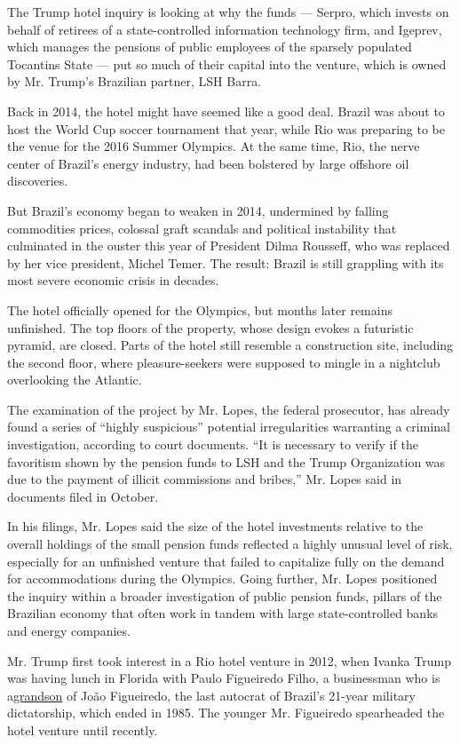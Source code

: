 The Trump hotel inquiry is looking at why the funds --- Serpro, which
invests on behalf of retirees of a state-controlled information
technology firm, and Igeprev, which manages the pensions of public
employees of the sparsely populated Tocantins State --- put so much of
their capital into the venture, which is owned by Mr. Trump's Brazilian
partner, LSH Barra.

Back in 2014, the hotel might have seemed like a good deal. Brazil was
about to host the World Cup soccer tournament that year, while Rio was
preparing to be the venue for the 2016 Summer Olympics. At the same
time, Rio, the nerve center of Brazil's energy industry, had been
bolstered by large offshore oil discoveries.

But Brazil's economy began to weaken in 2014, undermined by falling
commodities prices, colossal graft scandals and political instability
that culminated in the ouster this year of President Dilma Rousseff, who
was replaced by her vice president, Michel Temer. The result: Brazil is
still grappling with its most severe economic crisis in decades.

The hotel officially opened for the Olympics, but months later remains
unfinished. The top floors of the property, whose design evokes a
futuristic pyramid, are closed. Parts of the hotel still resemble a
construction site, including the second floor, where pleasure-seekers
were supposed to mingle in a nightclub overlooking the Atlantic.

The examination of the project by Mr. Lopes, the federal prosecutor, has
already found a series of ``highly suspicious'' potential irregularities
warranting a criminal investigation, according to court documents. ``It
is necessary to verify if the favoritism shown by the pension funds to
LSH and the Trump Organization was due to the payment of illicit
commissions and bribes,'' Mr. Lopes said in documents filed in October.

In his filings, Mr. Lopes said the size of the hotel investments
relative to the overall holdings of the small pension funds reflected a
highly unusual level of risk, especially for an unfinished venture that
failed to capitalize fully on the demand for accommodations during the
Olympics. Going further, Mr. Lopes positioned the inquiry within a
broader investigation of public pension funds, pillars of the Brazilian
economy that often work in tandem with large state-controlled banks and
energy companies.

Mr. Trump first took interest in a Rio hotel venture in 2012, when
Ivanka Trump was having lunch in Florida with Paulo Figueiredo Filho, a
businessman who is
a\href{http://www.nytimes.com/2015/08/21/world/americas/donald-trump-hotel-rio-immigration.html}{grandson}
of João Figueiredo, the last autocrat of Brazil's 21-year military
dictatorship, which ended in 1985. The younger Mr. Figueiredo
spearheaded the hotel venture until recently.

